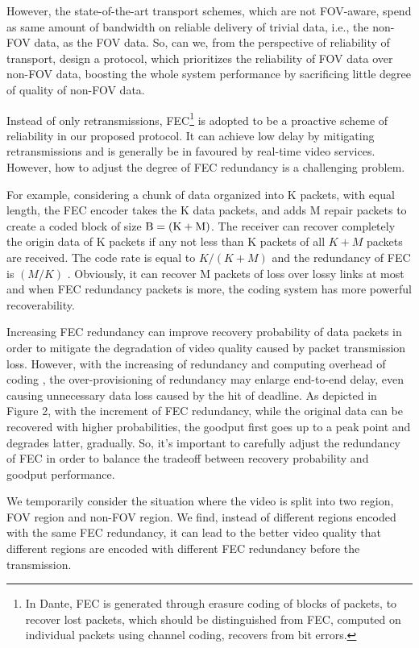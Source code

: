 	
	However, the state-of-the-art transport schemes, which are not FOV-aware, spend as same amount of bandwidth on reliable delivery of trivial data, i.e., the non-FOV data, as the FOV data. So, can we, from the perspective of reliability of transport, design a protocol, which prioritizes the reliability of FOV data over non-FOV data, boosting the whole system performance by sacrificing little degree of quality of non-FOV data.

    
	Instead of only retransmissions, FEC\footnote{In Dante, FEC is generated through erasure coding of blocks of packets, to recover lost packets, which should be distinguished from FEC, computed on individual packets using channel coding, recovers from bit errors.} is adopted to be a proactive scheme of reliability in our proposed protocol. It can achieve low delay by mitigating retransmissions and is generally be in favoured by real-time video services. However, how to adjust the degree of FEC redundancy is a challenging problem. 
	 
	For example, considering a chunk of data organized into K packets, with equal length, the FEC encoder takes the K data packets, and adds M repair packets to create a coded block of size ${\rm{B = (K + M)}}$. The receiver can recover completely the origin data of K packets if any not less than K packets of all ${K + M}$ packets are received. The code rate is equal to ${K/(K + M)}$ and the redundancy of FEC is ${(M/K)}$ . Obviously, it can recover M packets of loss over lossy links at most and when FEC redundancy packets is more, the coding system has more powerful recoverability. 	 
	
    Increasing FEC redundancy can improve recovery probability of data packets in order to mitigate the degradation of video quality caused by packet transmission loss. However, with the increasing of redundancy and computing overhead of coding \cite{ASCOT}, the over-provisioning of redundancy may enlarge end-to-end delay, even causing unnecessary data loss caused by the hit of deadline. As depicted in Figure 2, with the increment of FEC redundancy, while the original data can be recovered with higher probabilities, the goodput first goes up to a peak point and degrades  latter, gradually. So, it's important to carefully adjust the redundancy of FEC in order to balance the tradeoff between recovery probability and goodput performance.  
	 
	We temporarily consider the situation where the video is split into two region, FOV region and non-FOV region. We find, instead of different regions encoded with the same FEC redundancy, it can lead to the better video quality that different regions are encoded with different FEC redundancy before the transmission. 
	 
